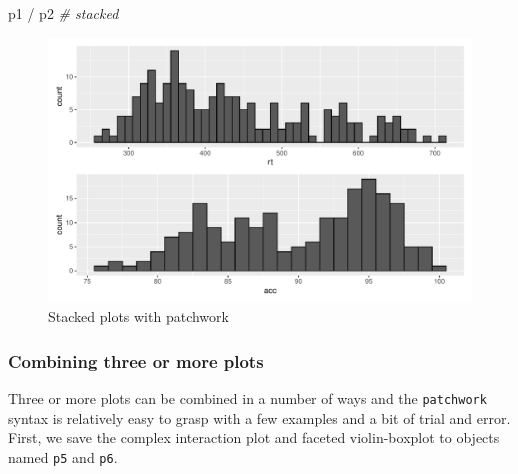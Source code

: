 \documentclass[
  english,
  doc,floatsintext]{apa6}
\newenvironment{Shaded}{\begin{snugshade}}{\end{snugshade}}
\newcommand{\CommentTok}[1]{\textcolor[rgb]{0.56,0.35,0.01}{\textit{#1}}}
\newcommand{\NormalTok}[1]{#1}
\newcommand{\SpecialCharTok}[1]{\textcolor[rgb]{0.00,0.00,0.00}{#1}}
\begin{document}
\begin{Shaded}
\begin{Highlighting}[]
\NormalTok{p1 }\SpecialCharTok{/}\NormalTok{ p2 }\CommentTok{\# stacked}
\end{Highlighting}
\end{Shaded}

\begin{figure}

{\centering \includegraphics[width=1\linewidth]{images/patchwork-stack-1} 

}

\caption{Stacked plots with patchwork}\label{fig:patchwork-stack}
\end{figure}

\hypertarget{combining-three-or-more-plots}{%
\subsubsection{Combining three or more plots}\label{combining-three-or-more-plots}}

Three or more plots can be combined in a number of ways and the \texttt{patchwork} syntax is relatively easy to grasp with a few examples and a bit of trial and error. First, we save the complex interaction plot and faceted violin-boxplot to objects named \texttt{p5} and \texttt{p6}.
\end{document}
